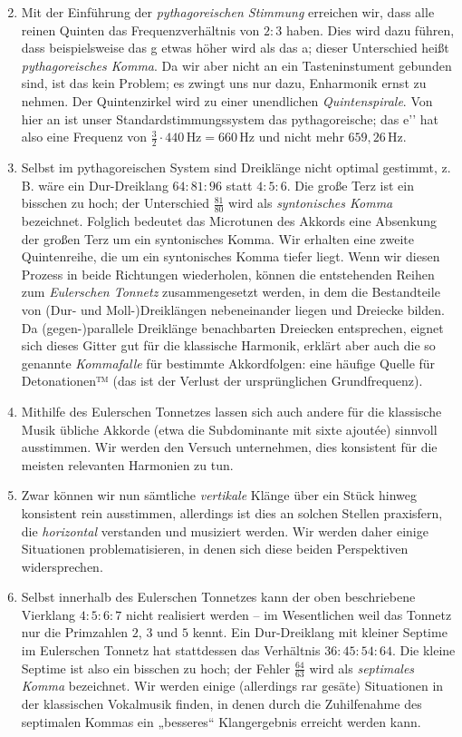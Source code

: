 \begin{enumerate}
  \setcounter{enumi}{1}
\item Mit der Einführung der \emph{pythagoreischen Stimmung} erreichen wir, dass
  alle reinen Quinten das Frequenzverhältnis von $2:3$ haben. Dies wird dazu
  führen, dass beispielsweise das \sharp g etwas höher wird als das \flat a;
  dieser Unterschied heißt \emph{pythagoreisches Komma}. Da wir aber nicht an
  ein Tasteninstument gebunden sind, ist das kein Problem; es zwingt uns nur
  dazu, Enharmonik ernst zu nehmen. Der Quintenzirkel wird zu einer unendlichen
  \emph{Quintenspirale}.  Von hier an ist unser Standardstimmungssystem das
  pythagoreische; das e’’ hat also eine Frequenz von
  $\frac32\cdot 440\,\text{Hz}=660\,\text{Hz}$ und nicht mehr
  $659{,}26\,\text{Hz}$.
\item Selbst im pythagoreischen System sind Dreiklänge nicht optimal gestimmt,
  z.\,B. wäre ein Dur-Dreiklang $64:81:96$ statt $4:5:6$. Die große Terz ist ein
  bisschen zu hoch; der Unterschied $\frac{81}{80}$ wird als \emph{syntonisches
  Komma} bezeichnet. Folglich bedeutet das Microtunen des Akkords eine
  Absenkung der großen Terz um ein syntonisches Komma. Wir erhalten eine zweite
  Quintenreihe, die um ein syntonisches Komma tiefer liegt. Wenn wir diesen
  Prozess in beide Richtungen wiederholen, können die entstehenden Reihen zum
  \emph{Eulerschen Tonnetz} zusammengesetzt werden, in dem die Bestandteile von (Dur-
  und Moll-)Dreiklängen nebeneinander liegen und Dreiecke bilden. Da
  \mbox{(gegen-)}parallele Dreiklänge benachbarten Dreiecken entsprechen, eignet sich
  dieses Gitter gut für die klassische Harmonik, erklärt aber auch die so
  genannte \emph{Kommafalle} für bestimmte Akkordfolgen: eine häufige Quelle
  für Detonationen™ (das ist der Verlust der ursprünglichen Grundfrequenz).
\item Mithilfe des Eulerschen Tonnetzes lassen sich auch andere für die
  klassische Musik übliche Akkorde (etwa die Subdominante mit sixte ajoutée)
  sinnvoll ausstimmen. Wir werden den Versuch unternehmen, dies konsistent für
  die meisten relevanten Harmonien zu tun.
\item Zwar können wir nun sämtliche \emph{vertikale} Klänge über ein Stück
  hinweg konsistent rein ausstimmen, allerdings ist dies an solchen
  Stellen praxisfern, die \emph{horizontal} verstanden und musiziert werden. Wir
  werden daher einige Situationen problematisieren, in denen sich diese beiden
  Perspektiven widersprechen.
\item Selbst innerhalb des Eulerschen Tonnetzes kann der oben beschriebene
  Vierklang $4:5:6:7$ nicht realisiert werden – im Wesentlichen weil das Tonnetz
  nur die Primzahlen $2$, $3$ und $5$ kennt. Ein Dur-Dreiklang mit kleiner
  Septime im Eulerschen Tonnetz hat stattdessen das Verhältnis $36:45:54:64$.
  Die kleine Septime ist also ein bisschen zu hoch; der Fehler $\frac{64}{63}$
  wird als \emph{septimales Komma} bezeichnet. Wir werden einige (allerdings rar
  gesäte) Situationen in der klassischen Vokalmusik finden, in denen durch die
  Zuhilfenahme des septimalen Kommas ein „besseres“ Klangergebnis erreicht
  werden kann.
\end{enumerate}

